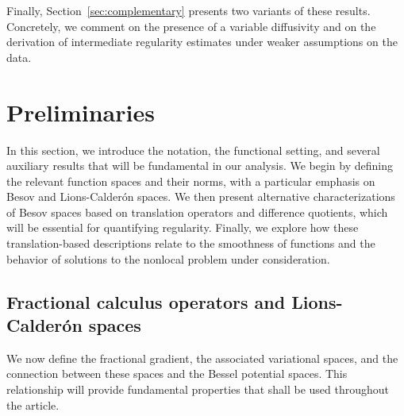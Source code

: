 \documentclass[]{amsart}
\theoremstyle{definition}
\theoremstyle{definition}
\theoremstyle{remark}
\numberwithin{equation}{section}
\begin{document}
Finally, Section~\ref{sec:complementary} presents two variants of these results. Concretely, we comment on the presence of a variable diffusivity and on the derivation of intermediate regularity estimates under weaker assumptions on the data.

	\section{Preliminaries} \label{sec:preliminaries}
	
	In this section, we introduce the notation, the functional setting, and several auxiliary results that will be fundamental in our analysis. We begin by defining the relevant function spaces and their norms, with a particular emphasis on Besov and Lions-Calderón spaces. We then present alternative characterizations of Besov spaces based on translation operators and difference quotients, which will be essential for quantifying regularity. Finally, we explore how these translation-based descriptions relate to the smoothness of functions and the behavior of solutions to the nonlocal problem under consideration.

	
	\subsection{Fractional calculus operators and Lions-Calder\'on spaces}
	 
	We now define the fractional gradient, the associated variational spaces, and the connection between these spaces and the Bessel potential spaces. This relationship will provide fundamental properties that shall be used throughout the article.
	
\end{document}
